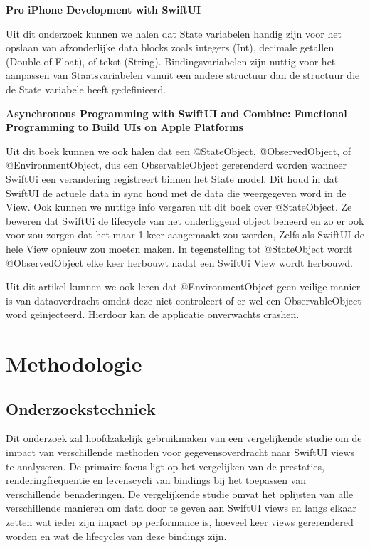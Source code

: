 \textbf{Pro iPhone Development with SwiftUI~\autocite{WangWallace2022PIDw}}

Uit dit onderzoek kunnen we halen dat State variabelen handig zijn voor het opslaan van afzonderlijke data blocks zoals integers (Int), decimale getallen (Double of Float), of tekst (String). Bindingsvariabelen zijn nuttig voor het aanpassen van Staatsvariabelen vanuit een andere structuur dan de structuur die de State variabele heeft gedefinieerd.

\textbf{Asynchronous Programming with SwiftUI and Combine: Functional Programming to Build UIs on Apple Platforms~\autocite{friese2023state}}

Uit dit boek kunnen we ook halen dat een @StateObject, @ObservedObject, of @EnvironmentObject, dus een ObservableObject gererenderd worden wanneer SwiftUi een verandering registreert binnen het State model. Dit houd in dat SwiftUI de actuele data in sync houd met de data die weergegeven word in de View. Ook kunnen we nuttige info vergaren uit dit boek over @StateObject. Ze beweren dat SwiftUi de lifecycle van het onderliggend object beheerd en zo er ook voor zou zorgen dat het maar 1 keer aangemaakt zou worden, Zelfs als SwiftUI de hele View opnieuw zou moeten maken. In tegenstelling tot @StateObject wordt @ObservedObject elke keer herbouwt nadat een SwiftUi View wordt herbouwd.

Uit dit artikel kunnen we ook leren dat @EnvironmentObject geen veilige manier is van dataoverdracht omdat deze niet controleert of er wel een ObservableObject word geïnjecteerd. Hierdoor kan de applicatie onverwachts crashen.






\section{Methodologie}%
\label{sec:methodologie}

\subsection{Onderzoekstechniek}
Dit onderzoek zal hoofdzakelijk gebruikmaken van een vergelijkende studie om de impact van verschillende methoden voor gegevensoverdracht naar SwiftUI views te analyseren. De primaire focus ligt op het vergelijken van de prestaties, renderingfrequentie en levenscycli van bindings bij het toepassen van verschillende benaderingen. De vergelijkende studie omvat het oplijsten van alle verschillende manieren om data door te geven aan SwiftUI views en langs elkaar zetten wat ieder zijn impact op performance is, hoeveel keer views gererendered  worden en wat de lifecycles van deze bindings zijn. 

